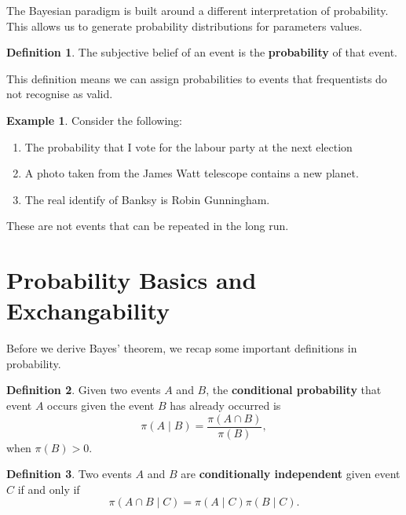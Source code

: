 \documentclass[
]{book}
\theoremstyle{definition}
\newtheorem{definition}{Definition}[chapter]
\theoremstyle{definition}
\newtheorem{example}{Example}[chapter]
\theoremstyle{definition}
\theoremstyle{definition}
\theoremstyle{remark}
\begin{document}
The Bayesian paradigm is built around a different interpretation of probability. This allows us to generate probability distributions for parameters values.

\begin{definition}
The subjective belief of an event is the \textbf{probability} of that event.
\end{definition}

This definition means we can assign probabilities to events that frequentists do not recognise as valid.

\begin{example}
Consider the following:

\begin{enumerate}
\def\labelenumi{\arabic{enumi}.}
\item
  The probability that I vote for the labour party at the next election
\item
  A photo taken from the James Watt telescope contains a new planet.
\item
  The real identify of Banksy is Robin Gunningham.
\end{enumerate}

These are not events that can be repeated in the long run.
\end{example}

\section{Probability Basics and Exchangability}\label{probability-basics-and-exchangability}

Before we derive Bayes' theorem, we recap some important definitions in probability.

\begin{definition}
Given two events \(A\) and \(B\), the \textbf{conditional probability} that event \(A\) occurs given the event \(B\) has already occurred is
\[
\pi(A \mid B) = \frac{\pi(A \cap B)}{\pi(B)}, 
\]
when \(\pi(B) > 0\).
\end{definition}

\begin{definition}
Two events \(A\) and \(B\) are \textbf{conditionally independent} given event \(C\) if and only if
\[ \pi(A \cap B \mid C) = \pi(A \mid C)\pi(B \mid C).\]
\end{definition}
\end{document}
